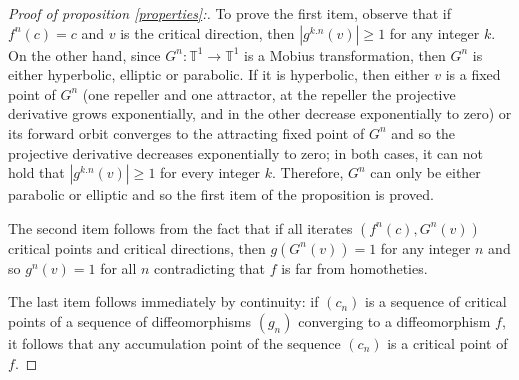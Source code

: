 \documentclass[a4paper,11pt]{article}
\theoremstyle{definition}
\def\TT{{\mathbb T}}
\def\de{\delta}
\begin{document}
\begin{proof}[ Proof of proposition \ref{properties}:]   


To prove the first item, observe that if $f^n(c)=c$ and $v$ is the critical direction, then $|g^{k.n}(v)|\geq 1$ for any integer $k$. On the other hand, since $G^n:\TT^1\to \TT^1$ is a Mobius transformation, then $G^n$ is either hyperbolic, elliptic or parabolic. If it is hyperbolic, then either $v$ is a fixed point of $G^n$ (one repeller and one attractor, at the repeller the projective derivative grows exponentially, and in the other decrease exponentially to zero) or its forward orbit converges to the attracting  fixed point of $G^n$ and so the projective derivative  decreases exponentially to zero; in both cases, it can not hold that $|g^{k.n}(v)|\geq 1$ for every integer $k$. Therefore, $G^n$  can only be either parabolic or elliptic and so the first item of the proposition is proved.

The second item follows from the fact that if all iterates $(f^n(c), G^n(v))$ critical points and critical directions, then $g(G^n(v))=1$ for any integer $n$ and so $g^n(v)=1$ for all $n$ contradicting that $f$ is far from homotheties.


The last item follows immediately by continuity: if $(c_n)$ is a sequence of critical points of a sequence of diffeomorphisms $(g_n)$ converging to a diffeomorphism $f$, it follows that any accumulation point of the sequence $(c_n)$ is a critical point of $f.$   


\end{proof}
\end{document}
